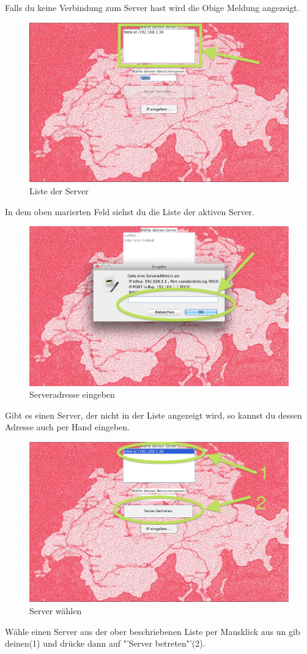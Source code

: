 \documentclass[ngerman, 12pt, pdftex]{scrartcl}[2006/07/30]
\begin{document}
Falls du keine Verbindung zum Server hast wird die Obige Meldung angezeigt.

\newpage

\begin{figure}[h]
\centering
\includegraphics[scale=0.3]{starten/serverliste.png}
\caption{Liste der Server}
\end{figure}

In dem oben marierten Feld siehst du die Liste der aktiven Server.

\begin{figure}[h]
\centering
\includegraphics[scale=0.3]{starten/IP_manuell_eingeben.png}
\caption{Serveradresse eingeben}
\end{figure}

Gibt es einen Server, der nicht in der Liste angezeigt wird, so kannst du dessen Adresse auch per
Hand eingeben.

\newpage

\begin{figure}[h]
\centering
\includegraphics[scale=0.3]{starten/server_waehlen.png}
\caption{Server w\"{a}hlen}
\end{figure}

W\"{a}hle einen Server aus der ober beschriebenen Liste per Mausklick aus un gib deinen(1) und dr\"{u}cke dann auf "'Server betreten"'(2).
\end{document}
